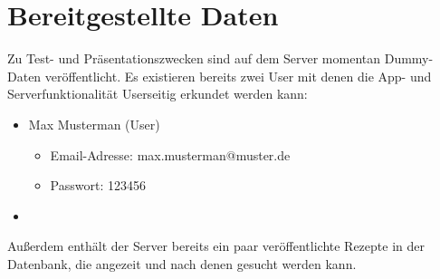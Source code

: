 \chapter{Bereitgestellte Daten}
Zu Test- und Präsentationszwecken sind auf dem Server momentan Dummy-Daten veröffentlicht.
Es existieren bereits zwei User mit denen die App- und Serverfunktionalität Userseitig erkundet werden kann:

\begin{itemize}
	\item Max Musterman (User)
	\begin{itemize}
		\item Email-Adresse: max.musterman@muster.de
		\item Passwort: 123456
	\end{itemize}
	\item 
\end{itemize}

Außerdem enthält der Server bereits ein paar veröffentlichte Rezepte in der Datenbank, die angezeit und nach denen gesucht werden kann.